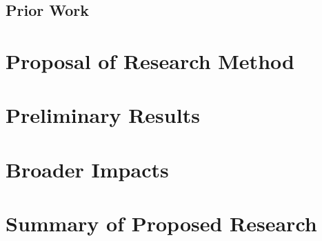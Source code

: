 \subsection{Prior Work}

\section{Proposal of Research Method}

\section{Preliminary Results}

\section{Broader Impacts}

\section{Summary of Proposed Research}